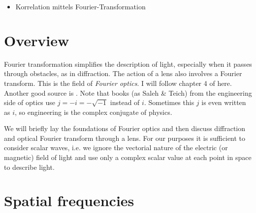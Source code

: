 \begin{itemize}

\item {Korrelation mittels Fourier-Transformation}

\end{itemize}



\section{Overview}
Fourier transformation simplifies the description of light, especially when it passes through obstacles, as in diffraction. The action of a lens also involves a Fourier transform. This is the field of \emph{Fourier optics}. I will follow chapter 4 of \cite{SalehTeich1991} here. Another good source is \cite{Goodman2005}. Note that books (as Saleh \& Teich) from the engineering  side of optics use $j = - i = - \sqrt{-1}$ instead of $i$. Sometimes this $j$ is even written as $i$, so engineering is the complex conjugate of physics.


We will briefly lay the foundations of Fourier optics and then discuss diffraction and optical Fourier transform through a lens. For our purposes it is sufficient to consider scalar waves, i.e. we ignore the vectorial nature of the electric (or magnetic) field of light and use only a complex scalar value at each point in space to describe light.

\section{Spatial frequencies}

